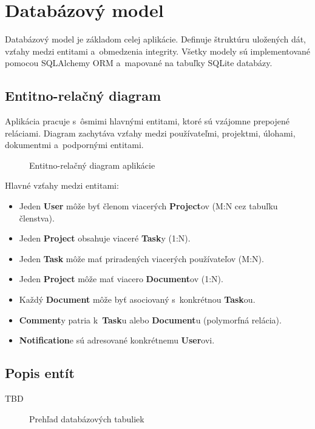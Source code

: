 \chapter{Databázový model}

        Databázový model je základom celej aplikácie. Definuje štruktúru uložených
dát, vzťahy medzi entitami a~obmedzenia integrity. Všetky modely sú implementované
pomocou SQLAlchemy ORM a~mapované na tabuľky SQLite databázy.

\section{Entitno-relačný diagram}

        Aplikácia pracuje s~ôsmimi hlavnými entitami, ktoré sú vzájomne prepojené
reláciami. Diagram zachytáva vzťahy medzi používateľmi, projektmi, úlohami,
dokumentmi a~podpornými entitami.

\begin{figure}[H]
  \centering
  \caption{Entitno-relačný diagram aplikácie}
  \label{fig:er_diagram}
\end{figure}

        Hlavné vzťahy medzi entitami:

\begin{itemize}
  \item Jeden \textbf{User} môže byť členom viacerých \textbf{Project}ov (M:N cez tabuľku členstva).
  \item Jeden \textbf{Project} obsahuje viaceré \textbf{Task}y (1:N).
  \item Jeden \textbf{Task} môže mať priradených viacerých používateľov (M:N).
  \item Jeden \textbf{Project} môže mať viacero \textbf{Document}ov (1:N).
  \item Každý \textbf{Document} môže byť asociovaný s~konkrétnou \textbf{Task}ou.
  \item \textbf{Comment}y patria k~\textbf{Task}u alebo \textbf{Document}u (polymorfná relácia).
  \item \textbf{Notification}e sú adresované konkrétnemu \textbf{User}ovi.
\end{itemize}

\section{Popis entít}
        TBD
\begin{figure}[H]
  \centering
  \caption{Prehľad databázových tabuliek}
  \label{fig:db_tables}
\end{figure}
